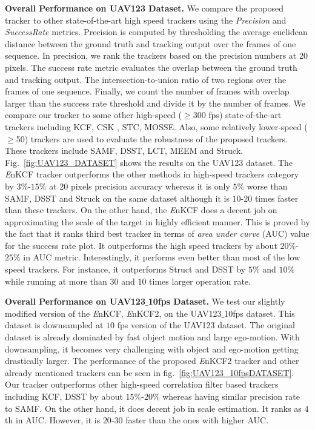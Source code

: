 \documentclass{bmvc2k}
\begin{document}
\textbf{Overall Performance on UAV123 Dataset.}
We compare the proposed tracker to other state-of-the-art high speed
trackers using the \textit{Precision} and \textit{Success\:Rate}
metrics. Precision is computed by thresholding the average euclidean
distance between the ground truth and tracking output over the frames
of one sequence. In precision, we rank the trackers based on the
precision numbers at 20 pixels. The success rate metric evaluates the
overlap between the ground truth and tracking output. The
intersection-to-union ratio of two regions over the frames of one
sequence. Finally, we count the number of frames with overlap larger
than the success rate threshold and divide it by the number of
frames. We compare our tracker to some other high-speed ($\geq$300
fps) state-of-the-art trackers including KCF\cite{henriques2015high},
CSK \cite{henriques2012exploiting}, STC\cite{zhang2014fast},
MOSSE\cite{bolme2010visual,henriques2015high}. Also, some relatively
lower-speed ($\geq$50) trackers are used to evaluate the robustness of
the proposed trackers. These trackers include SAMF\cite{li2014scale},
DSST\cite{danelljan2014accurate}, LCT\cite{ma2015long},
MEEM\cite{zhang2014meem} and Struck\cite{hare2012efficient}.
Fig.~\ref{fig:UAV123_DATASET} shows the results on the UAV123
dataset. The {\it E}nKCF tracker outperforms the other methods in
high-speed trackers category by $3\%$-$15\%$ at 20 pixels precision
accuracy whereas it is only $5\%$ worse than SAMF, DSST and Struck on
the same dataset although it is $10$-$20$ times faster than these
trackers. On the other hand, the {\it E}nKCF does a decent job on
approximating the scale of the target in highly efficient manner. This
is proved by the fact that it ranks third best tracker in terms of
\textit{area under curve} (AUC) value for the success rate plot. It
outperforms the high speed trackers by about $20\%$-$25\%$ in AUC
metric. Interestingly, it performs even better than most of the low
speed trackers. For instance, it outperforms Struct and DSST by $5\%$
and $10\%$ while running at more than $30$ and $10$ times larger
operation rate.

\textbf{Overall Performance on UAV123$\_$10fps Dataset.} We test our slightly modified version of the 
{\it E}nKCF, {\it E}nKCF2, on the UAV123$\_$10fps dataset. This dataset is downsampled at $10$ fps version 
of the UAV123 dataset. The original dataset is already dominated by fast object motion and large ego-motion. With downsampling, 
it becomes very challenging with object and ego-motion getting drastically larger. The performance of the proposed {\it E}nKCF2 tracker
and other already mentioned trackers can be seen in fig.~\ref{fig:UAV123_10fpsDATASET}. Our tracker outperforms other high-speed correlation filter based 
trackers including KCF, DSST by about $15\%$-$20\%$ whereas having similar precision rate to SAMF. On the other hand, it does decent job in scale estimation. It ranks as $4$th
in AUC. However, it is $20$-$30$ faster than the ones with higher AUC. 
\end{document}
